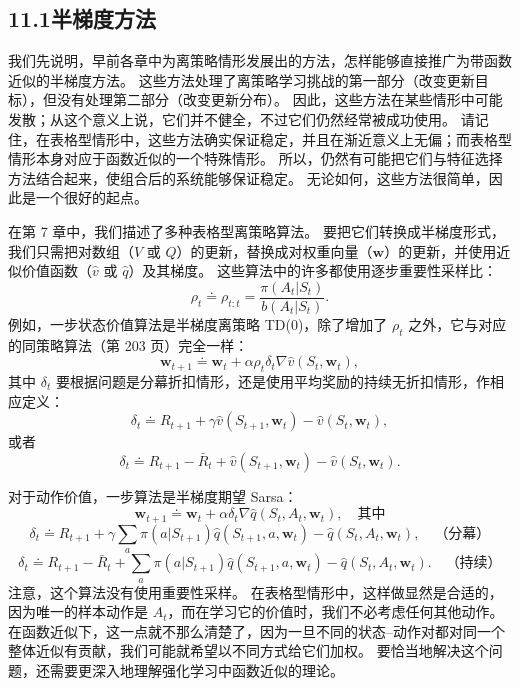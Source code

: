 \documentclass[UTF8, 12pt, fontset=fandol, oneside]{ctexart}
\begin{document}
\subsection*{11.1\quad 半梯度方法}

我们先说明，早前各章中为离策略情形发展出的方法，怎样能够直接推广为带函数近似的半梯度方法。
这些方法处理了离策略学习挑战的第一部分（改变更新目标），但没有处理第二部分（改变更新分布）。
因此，这些方法在某些情形中可能发散；从这个意义上说，它们并不健全，不过它们仍然经常被成功使用。
请记住，在表格型情形中，这些方法确实保证稳定，并且在渐近意义上无偏；而表格型情形本身对应于函数近似的一个特殊情形。
所以，仍然有可能把它们与特征选择方法结合起来，使组合后的系统能够保证稳定。
无论如何，这些方法很简单，因此是一个很好的起点。

在第 7 章中，我们描述了多种表格型离策略算法。
要把它们转换成半梯度形式，我们只需把对数组（$V$ 或 $Q$）的更新，替换成对权重向量（$\mathbf{w}$）的更新，并使用近似价值函数（$\hat v$ 或 $\hat q$）及其梯度。
这些算法中的许多都使用逐步重要性采样比：
\begin{equation}
\rho_t\doteq\rho_{t:t}=\frac{\pi(A_t|S_t)}{b(A_t|S_t)}.
\tag{11.1}
\end{equation}
例如，一步状态价值算法是半梯度离策略 TD(0)，除了增加了 $\rho_t$ 之外，它与对应的同策略算法（第 203 页）完全一样：
\begin{equation}
\mathbf{w}_{t+1}\doteq \mathbf{w}_t+\alpha\rho_t\delta_t\nabla\hat v(S_t,\mathbf{w}_t),
\tag{11.2}
\end{equation}
其中 $\delta_t$ 要根据问题是分幕折扣情形，还是使用平均奖励的持续无折扣情形，作相应定义：
\begin{equation}
\delta_t\doteq R_{t+1}+\gamma\hat v(S_{t+1},\mathbf{w}_t)-\hat v(S_t,\mathbf{w}_t),
\tag{11.3}
\end{equation}
或者
\begin{equation}
\delta_t\doteq R_{t+1}-\bar R_t+\hat v(S_{t+1},\mathbf{w}_t)-\hat v(S_t,\mathbf{w}_t).
\tag{11.4}
\end{equation}

对于动作价值，一步算法是半梯度期望 Sarsa：
\begin{equation}
\mathbf{w}_{t+1}\doteq \mathbf{w}_t+\alpha\delta_t\nabla\hat q(S_t,A_t,\mathbf{w}_t),
\quad\text{其中}
\tag{11.5}
\end{equation}
\[
\delta_t\doteq R_{t+1}+\gamma\sum_a\pi(a|S_{t+1})\hat q(S_{t+1},a,\mathbf{w}_t)-\hat q(S_t,A_t,\mathbf{w}_t),
\quad \text{（分幕）}
\]
\[
\delta_t\doteq R_{t+1}-\bar R_t+\sum_a\pi(a|S_{t+1})\hat q(S_{t+1},a,\mathbf{w}_t)-\hat q(S_t,A_t,\mathbf{w}_t).
\quad \text{（持续）}
\]
注意，这个算法没有使用重要性采样。
在表格型情形中，这样做显然是合适的，因为唯一的样本动作是 $A_t$，而在学习它的价值时，我们不必考虑任何其他动作。
在函数近似下，这一点就不那么清楚了，因为一旦不同的状态--动作对都对同一个整体近似有贡献，我们可能就希望以不同方式给它们加权。
要恰当地解决这个问题，还需要更深入地理解强化学习中函数近似的理论。
\end{document}
